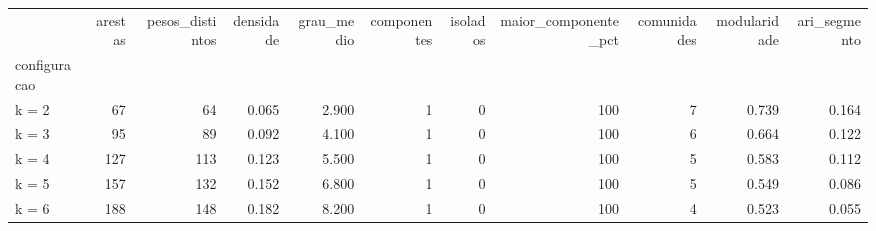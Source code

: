 \begin{tabular}{lrrrrrrrrrr}
\toprule
 & arestas & pesos\_distintos & densidade & grau\_medio & componentes & isolados & maior\_componente\_pct & comunidades & modularidade & ari\_segmento \\
configuracao &  &  &  &  &  &  &  &  &  &  \\
\midrule
k = 2 & 67 & 64 & 0.065 & 2.900 & 1 & 0 & 100 & 7 & 0.739 & 0.164 \\
k = 3 & 95 & 89 & 0.092 & 4.100 & 1 & 0 & 100 & 6 & 0.664 & 0.122 \\
k = 4 & 127 & 113 & 0.123 & 5.500 & 1 & 0 & 100 & 5 & 0.583 & 0.112 \\
k = 5 & 157 & 132 & 0.152 & 6.800 & 1 & 0 & 100 & 5 & 0.549 & 0.086 \\
k = 6 & 188 & 148 & 0.182 & 8.200 & 1 & 0 & 100 & 4 & 0.523 & 0.055 \\
\bottomrule
\end{tabular}
